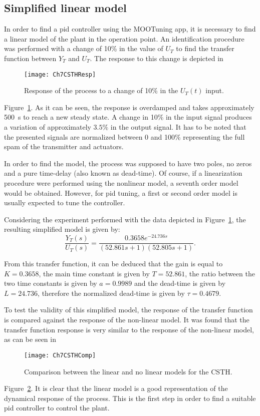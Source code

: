 \subsection{Simplified linear model}
\label{sec:SimpLinMod}
In order to find a \gls{pid} controller using the MOOTuning app, it is necessary to find a linear model of the plant in the operation point. An identification procedure was performed with a change of 10\% in the value of $U_T$ to find the transfer function between $Y_T$ and $U_T$. The response to this change is depicted in %
\begin{figure}[tb]
	\centering
	\texttt{[image: Ch7CSTHResp]}
	\caption{Response of the process to a change of 10\% in the $U_T(t)$ input.}
	\label{fig:Ch7CSTHResp}
\end{figure}
%
Figure~\ref{fig:Ch7CSTHResp}. As it can be seen, the response is overdamped and takes approximately \SI{500}{\second} to reach a new steady state. A change in 10\% in the input signal produces a variation of approximately $3.5\%$ in the output signal. It has to be noted that the presented signals are normalized between 0 and 100\% representing the full spam of the transmitter and actuators.

In order to find the model, the process was supposed to have two poles, no zeros and a pure time-delay (also known as dead-time). Of course, if a linearization procedure were performed using the nonlinear model, a seventh order model would be obtained. However, for \gls{pid} tuning, a first or second order model is usually expected to tune the controller.

Considering the experiment performed with the data depicted in Figure~\ref{fig:Ch7CSTHResp}, the resulting simplified model is given by:
%
\begin{equation}
\frac{Y_T(s)}{U_T(s)} = \frac{0.3658 e^{-24.736 s}}{(52.861 s+1)(52.805 s +1)}.
\label{eq:TFCSTH}
\end{equation}

From this transfer function, it can be deduced that the gain is equal to $K = 0.3658$, the main time constant is given by $T = 52.861$, the ratio between the two time constants is given by $a = 0.9989$ and the dead-time is given by $L = 24.736$, therefore the normalized dead-time is given by $\tau = 0.4679$.

To test the validity of this simplified model, the response of the transfer function is compared against the response of the non-linear model. It was found that the transfer function response is very similar to the response of the non-linear model, as can be seen in %
%
\begin{figure}[tb]
	\centering
	\texttt{[image: Ch7CSTHComp]}
	\caption{Comparison between the linear and no linear models for the CSTH.}
	\label{fig:Ch7CSTHComp}
\end{figure}
%
Figure~\ref{fig:Ch7CSTHComp}. It is clear that the linear model is a good representation of the dynamical response of the process. This is the first step in order to find a suitable \gls{pid} controller to control the plant.

